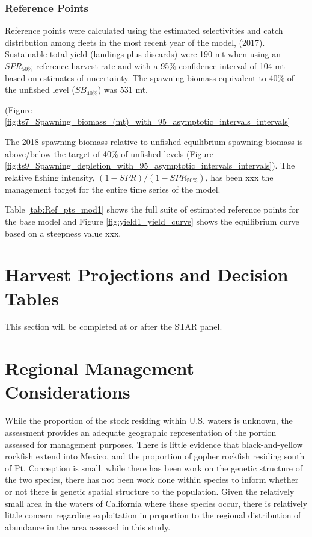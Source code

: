 \documentclass[12pt,]{article}
\begin{document}
\subsubsection{Reference Points}\label{reference-points-1}

Reference points were calculated using the estimated selectivities and
catch distribution among fleets in the most recent year of the model,
(2017). Sustainable total yield (landings plus discards) were 190 mt
when using an \(SPR_{50\%}\) reference harvest rate and with a 95\%
confidence interval of 104 mt based on estimates of uncertainty. The
spawning biomass equivalent to 40\% of the unfished level
(\(SB_{40\%}\)) was 531 mt.

(Figure
\ref{fig:ts7_Spawning_biomass_(mt)_with_95_asymptotic_intervals_intervals}

The 2018 spawning biomass relative to unfished equilibrium spawning
biomass is above/below the target of 40\% of unfished levels (Figure
\ref{fig:ts9_Spawning_depletion_with_95_asymptotic_intervals_intervals}).
The relative fishing intensity, \((1-SPR)/(1-SPR_{50\%})\), has been xxx
the management target for the entire time series of the model.

Table \ref{tab:Ref_pts_mod1} shows the full suite of estimated reference
points for the base model and Figure \ref{fig:yield1_yield_curve} shows
the equilibrium curve based on a steepness value xxx.

\section{Harvest Projections and Decision
Tables}\label{harvest-projections-and-decision-tables}

This section will be completed at or after the STAR panel.

\section{Regional Management
Considerations}\label{regional-management-considerations}

While the proportion of the stock residing within U.S. waters is
unknown, the assessment provides an adequate geographic representation
of the portion assessed for management purposes. There is little
evidence that black-and-yellow rockfish extend into Mexico, and the
proportion of gopher rockfish residing south of Pt. Conception is small.
while there has been work on the genetic structure of the two species,
there has not been work done within species to inform whether or not
there is genetic spatial structure to the population. Given the
relatively small area in the waters of California where these species
occur, there is relatively little concern regarding exploitation in
proportion to the regional distribution of abundance in the area
assessed in this study.
\end{document}
